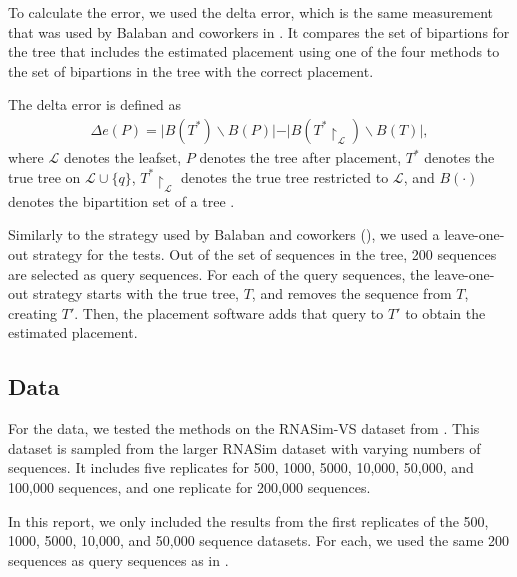 \documentclass[10pt]{article}
\begin{document}
To calculate the error, we used the delta error, which is the same measurement that was used by
Balaban and coworkers in \cite{balaban_apples_2020}.
It compares the set of bipartions for the tree that includes the estimated placement using one of the four methods to the set of bipartions in the tree with the correct placement.

The delta error is defined as
\begin{align*}
\Delta e(P) = \vert B(T^*) \backslash B(P) \vert - \vert B(T^* \upharpoonright_{\mathcal L}) \backslash B(T)\vert,
\end{align*}
where $\mathcal L$ denotes the leafset, \(P\) denotes the tree after placement, $T^*$ denotes the true tree on $\mathcal L \cup \{q\}$, $T^* \upharpoonright_{\mathcal L}$ denotes the true tree restricted to $\mathcal L$, and $B(\cdot)$ denotes the bipartition set of a tree \cite{balaban_apples_2020}.

Similarly to the strategy used by Balaban and coworkers (\cite{balaban_apples_2020}), we used a leave-one-out strategy for the tests.
Out of the set of sequences in the tree, 200 sequences are selected as query sequences.
For each of the query sequences, the leave-one-out strategy starts with the true tree, \(T\), and removes the sequence from \(T\), creating \(T'\).
Then, the placement software adds that query to \(T'\) to obtain the estimated placement.

\subsection{Data}

For the data, we tested the methods on the RNASim-VS dataset from \cite{balaban_apples_2020}. This dataset is sampled from the larger RNASim dataset with varying numbers of sequences. It includes five replicates for 500, 1000, 5000, 10,000, 50,000, and 100,000 sequences, and one replicate for 200,000 sequences.

In this report, we only included the results from the first replicates of the 500, 1000, 5000, 10,000, and 50,000 sequence datasets. For each, we used the same 200 sequences as query sequences as in \cite{balaban_apples_2020}.

\end{document}
